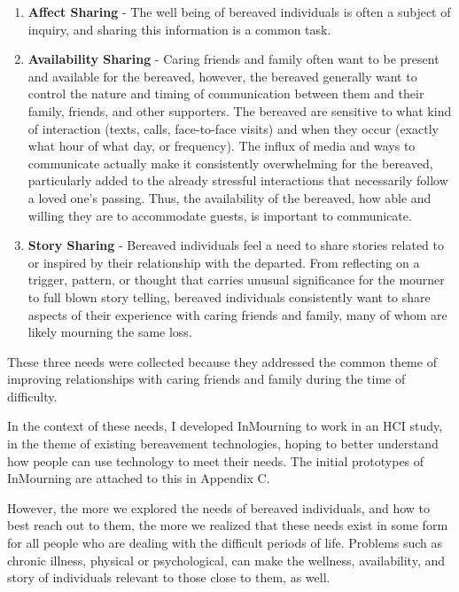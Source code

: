   \begin{enumerate}
  \item \textbf{Affect Sharing} - The well being of bereaved individuals is often a subject
    of inquiry, and sharing this information is a common task.
  \item \textbf{Availability Sharing} -
    Caring friends and family often want to be present
    and available for the bereaved, however,
    the bereaved generally want to control the nature and timing of communication between
    them and their family, friends, and other supporters.
    The bereaved are sensitive to what kind
    of interaction (texts, calls, face-to-face visits) and when they occur (exactly
    what hour of what day, or frequency). The influx of media and ways to
    communicate actually make it consistently overwhelming for the bereaved,
    particularly added to the already stressful interactions that necessarily
    follow a loved one's passing.
    Thus, the availability of the bereaved, how able and willing they are
    to accommodate guests, is important to communicate.
  \item \textbf{Story Sharing} - Bereaved individuals feel a need to share stories related to
    or inspired by their relationship with the departed.
    From reflecting on a trigger, pattern, or thought that carries unusual
    significance for the mourner to full blown story telling, bereaved individuals
    consistently want to share aspects of their experience with caring friends and
    family, many of whom are likely mourning the same loss.
  \end{enumerate}

  These three needs were collected because they addressed the common theme of improving
  relationships with caring friends and family during the time of difficulty.

  In the context of these needs, I developed InMourning to work in an HCI study,
  in the theme of existing bereavement technologies,
  hoping to better understand how people can use technology to meet their needs.
  The initial prototypes of InMourning are attached to this in Appendix C.

  However, the more we explored the needs of bereaved individuals,
  and how to best reach out to them, the more we realized that these needs exist in some form
  for all people who are dealing with the difficult periods of life.
  Problems such as chronic illness, physical or psychological,
  can make the wellness, availability, and story of individuals relevant to those
  close to them, as well.
